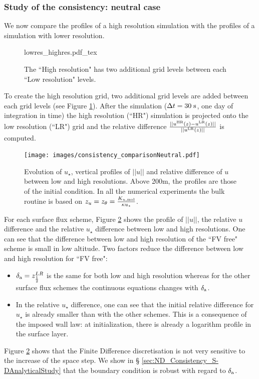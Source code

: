 \subsubsection{Study of the consistency: neutral case}
We now compare the profiles of a high
resolution simulation with the profiles
of a simulation with lower resolution.
\begin{figure}
	\centering
	{lowres_highres.pdf_tex}
	\caption{The ``High resolution" has two additional grid levels
	between each ``Low resolution" levels.}
	\label{fig:ND_Consistency_lowres_highres}
\end{figure}
To create the high resolution grid,
two additional grid levels are added between each grid levels
(see Figure \ref{fig:ND_Consistency_lowres_highres}).
After the simulation ($\Delta t=30\;{\rm s}$,
one day of integration in time) the high resolution (``HR") simulation
is projected onto the low resolution (``LR") grid and the relative difference
$\frac{||u^{\rm HR}(z) - u^{\rm LR}(z)||}{||u^{\rm LR}(z)||}$ is
computed.
\begin{figure}
	\centering
	\texttt{[image: images/consistency\_comparisonNeutral.pdf]}
	\caption{ Evolution of $u_\star$, vertical profiles of $||u||$
	and relative difference of $u$ between low and high resolutions.
	Above 200m, the profiles are those of the initial condition.
	In all the numerical experiments the bulk routine is based on
	$z_u = z_\theta = \frac{K_{u, \rm mol}}{\kappa u_\star}$.
	}
	\label{fig:ND_Consistency_Neutral}
\end{figure}
For each surface flux scheme, Figure \ref{fig:ND_Consistency_Neutral}
shows the profile of $||u||$,
the relative $u$ difference and the relative $u_\star$ difference
between low and high resolutions.
One can see that the difference between low and high resolution of
the ``FV free" scheme is small in low altitude.
Two factors reduce the difference between low and high resolution
for ``FV free":
\begin{itemize}
	\item $\delta_{\rm a} = z_{\frac{1}{2}}^{LR}$ is the same
		for both low and high resolution whereas for
		the other surface flux schemes the continuous
		equations changes with $\delta_{\rm a}$.
	\item In the relative $u_\star$ difference, one can see
		that the initial relative difference for
		$u_\star$ is already smaller than with the
		other schemes. This is a consequence of the
		imposed wall law: at initialization, there
		is already a logarithm profile in the
		surface layer.
\end{itemize}
Figure \ref{fig:ND_Consistency_Neutral} shows that the
Finite Difference discretisation is not very sensitive
to the increase of the space step. We show in \S
\ref{sec:ND_Consistency_S-DAnalyticalStudy} that
the boundary condition is robust with regard to
$\delta_{\rm a}$.

